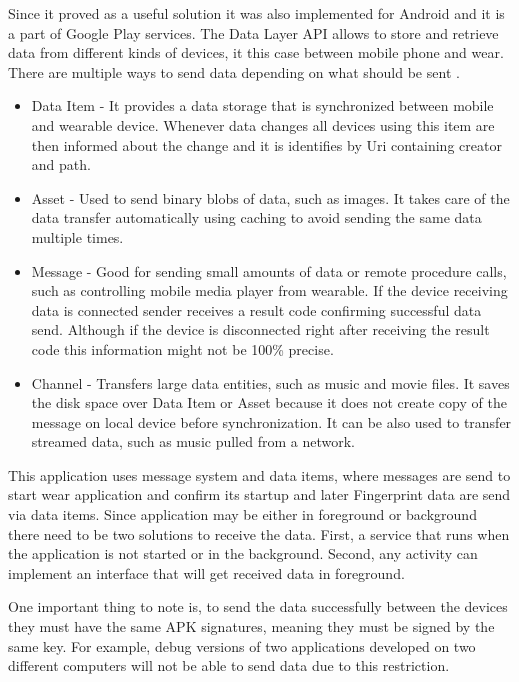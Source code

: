 Since it proved as a useful solution it was also implemented for Android and it is a part of Google Play services. The Data Layer API allows to store and retrieve data from different kinds of devices, it this case between mobile phone and wear. There are multiple ways to send data depending on what should be sent \cite{AD}.

\begin{itemize}
	\item Data Item - It provides a data storage that is synchronized between mobile and wearable device. Whenever data changes all devices using this item are then informed about the change and it is identifies by Uri containing creator and path.
	\item Asset - Used to send binary blobs of data, such as images. It takes care of the data transfer automatically using caching to avoid sending the same data multiple times.
	\item Message - Good for sending small amounts of data or remote procedure calls, such as controlling mobile media player from wearable. If the device receiving data is connected sender receives a result code confirming successful data send. Although if the device is disconnected right after receiving the result code this information might not be 100\% precise.
	\item Channel - Transfers large data entities, such as music and movie files. It saves the disk space over Data Item or Asset because it does not create copy of the message on local device before synchronization. It can be also used to transfer streamed data, such as music pulled from a network.
\end{itemize}

This application uses message system and data items, where messages are send to start wear application and confirm its startup and later Fingerprint data are send via data items. Since application may be either in foreground or background there need to be two solutions to receive the data. First, a service that runs when the application is not started or in the background. Second, any activity can implement an interface that will get received data in foreground.

One important thing to note is, to send the data successfully between the devices they must have the same APK signatures, meaning they must be signed by the same key. For example, debug versions of two applications developed on two different computers will not be able to send data due to this restriction.

